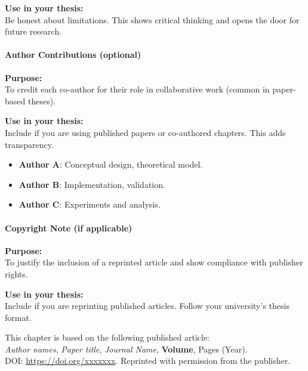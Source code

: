 \vspace{0.5em}
\textbf{Use in your thesis:} \\
Be honest about limitations. This shows critical thinking and opens the door for future research.

\paragraph{Author Contributions (optional)}
\textbf{Purpose:} \\
To credit each co-author for their role in collaborative work (common in paper-based theses).

\vspace{0.5em}
\textbf{Use in your thesis:} \\
Include if you are using published papers or co-authored chapters. This adds transparency.

\begin{itemize}
    \item \textbf{Author A}: Conceptual design, theoretical model.
    \item \textbf{Author B}: Implementation, validation.
    \item \textbf{Author C}: Experiments and analysis.
\end{itemize}

\paragraph{Copyright Note (if applicable)}
\textbf{Purpose:} \\
To justify the inclusion of a reprinted article and show compliance with publisher rights.

\vspace{0.5em}
\textbf{Use in your thesis:} \\
Include if you are reprinting published articles. Follow your university’s thesis format.

\vspace{0.5em}
This chapter is based on the following published article: \\
\textit{Author names}, \textit{Paper title}, \textit{Journal Name}, \textbf{Volume}, Pages (Year). \\
DOI: \url{https://doi.org/xxxxxxx}. Reprinted with permission from the publisher.


